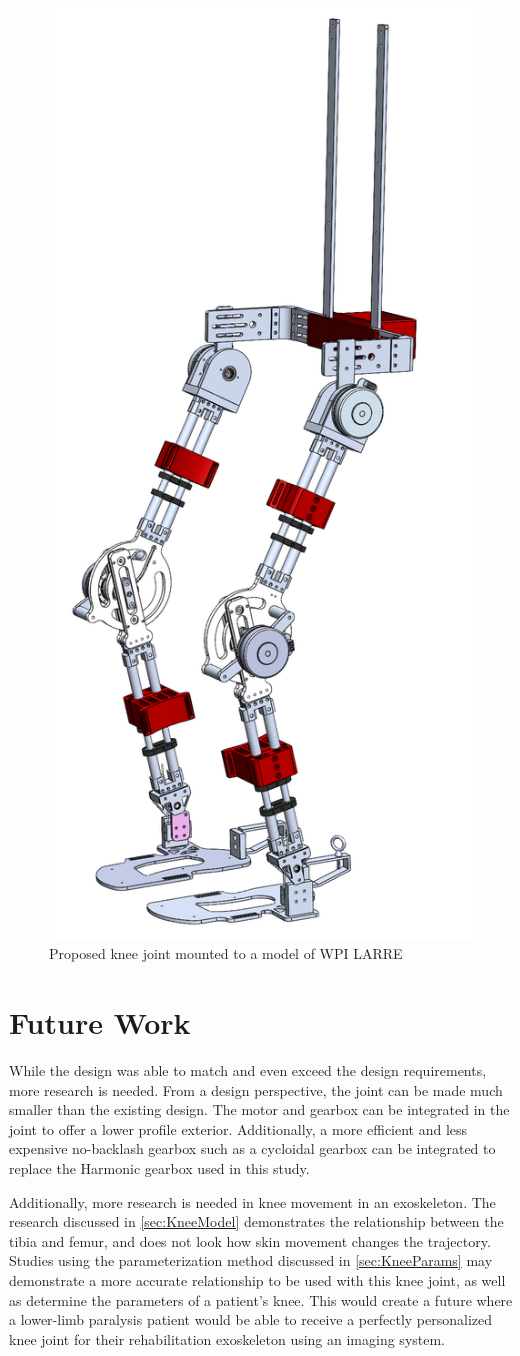 \begin{figure}[ht!]
    \centering
    \includegraphics[width=0.4\linewidth]{Figures/FinalExoRender.png}
    \caption{Proposed knee joint mounted to a model of WPI LARRE}
    \label{fig:KneeOnExo}
\end{figure}


\section{Future Work}

While the design was able to match and even exceed the design requirements, more research is needed. From a design perspective, the joint can be made much smaller than the existing design. The motor and gearbox can be integrated in the joint to offer a lower profile exterior. Additionally, a more efficient and less expensive no-backlash gearbox such as a cycloidal gearbox can be integrated to replace the {Harmonic\texttrademark} gearbox used in this study. 

Additionally, more research is needed in knee movement in an exoskeleton. The research discussed in \autoref{sec:KneeModel} demonstrates the relationship between the tibia and femur, and does not look how skin movement changes the trajectory. Studies using the parameterization method discussed in \autoref{sec:KneeParams} may demonstrate a more accurate relationship to be used with this knee joint, as well as determine the parameters of a patient's knee. This would create a future where a lower-limb paralysis patient would be able to receive a perfectly personalized knee joint for their rehabilitation exoskeleton using an imaging system. 